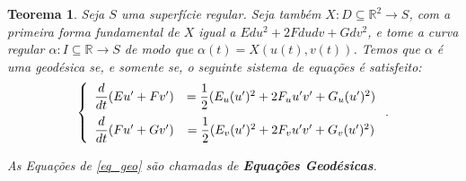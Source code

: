 \documentclass{article}
\newtheorem{theorem}{Teorema}
\begin{document}
\begin{theorem}
    \label{teo1}
    Seja $S$ uma superfície regular. Seja também $X : D\subseteq \mathbb{R}^2\to S$, com a primeira forma fundamental de $X$ igual a $Edu^2 + 2Fdudv + Gdv^2$, e tome a curva regular $\alpha : I\subseteq\mathbb{R}\to S$ de modo que $\alpha(t) = X(u(t), v(t))$. Temos que $\alpha$ é uma geodésica se, e somente se, o seguinte sistema de equações é satisfeito:
    \begin{equation}
        \label{eq_geo}
        \left\{\begin{array}{cc}
            \dfrac{d}{dt}(Eu' + Fv') & = \dfrac{1}{2}(E_u (u')^2 + 2F_u u'v' + G_u (u')^2) \vspace{6pt}\\
            \dfrac{d}{dt}(Fu' + Gv') & = \dfrac{1}{2}(E_v (u')^2 + 2F_v u'v' + G_v (u')^2)
        \end{array}\right..
    \end{equation}
    
    As Equações de \ref{eq_geo} são chamadas de \textbf{Equações Geodésicas}.
\end{theorem}
\end{document}
